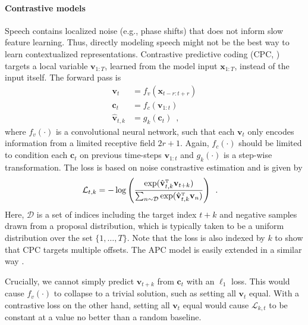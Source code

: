 {\paragraph{Contrastive models}
Speech contains localized noise (e.g., phase shifts) that does not inform slow feature learning. Thus, directly modeling speech might not be the best way to learn contextualized representations. Contrastive predictive coding (CPC,  \citealp{oord_representation_2018}) targets a local variable $\mathbf{v}_{1:T}$, learned from the model input $\mathbf{x}_{1:T}$, instead of the input itself. The forward pass is
%
\begin{align}
    \mathbf{v}_{t} &= f_{v}(\mathbf{x}_{t-r:t+r}) \label{eq_brief: cpc local representation} \\
    \mathbf{c}_{t} &= f_{c}(\mathbf{v}_{1:t}) \\
    \hat{\mathbf{v}}_{t,k} &= g_k(\mathbf{c}_{t}) \enspace,
\end{align}
%
\noindent where $f_v(\cdot)$ is a convolutional neural network, such that each $\mathbf{v}_{t}$ only encodes information from a limited receptive field $2r+1$. Again, $f_c(\cdot)$ should be limited to condition each $\mathbf{c}_t$ on previous time-steps $\mathbf{v}_{1:t}$ and $g_k(\cdot)$ is a step-wise transformation. The loss is based on noise constrastive estimation \parencite{gutmann_noisecontrastive_2010} and is given by
\begin{align}
    \mathcal{L}_{t,k} &= - \log \left(\frac{\exp(\hat{\mathbf{v}}_{t,k}^{\text{\tiny T}}\mathbf{v}_{t+k})}{\sum_{n \sim \mathcal{D}} \exp(\hat{\mathbf{v}}_{t,k}^{\text{\tiny T}}\mathbf{v}_{n})} \right)\enspace .
    \label{eq_brief: cpc loss}
\end{align}
%
\noindent Here, $\mathcal{D}$ is a set of indices including the target index $t+k$ and negative samples drawn from a proposal distribution, which is typically taken to be a uniform distribution over the set $\{1,\dots,T\}$. Note that the loss is also indexed by $k$ to show that CPC targets multiple offsets. The APC model is easily extended in a similar way \parencite{chung_improved_2020}.

Crucially, we cannot simply predict $\mathbf{v}_{t+k}$ from $\mathbf{c}_t$ with an $\ell_1$ loss. This would cause $f_v(\cdot)$ to collapse to a trivial solution, such as setting all $\mathbf{v}_t$ equal. With a contrastive loss on the other hand, setting all $\mathbf{v}_t$ equal would cause $\mathcal{L}_{k,t}$ to be constant at a value no better than a random baseline. 

}
